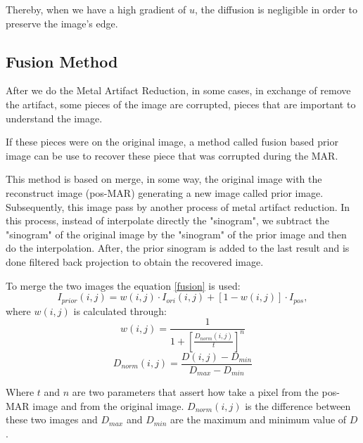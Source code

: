 Thereby, when we have a high gradient of $u$, the diffusion is negligible in order to preserve the image's edge.

\subsection{Fusion Method}

After we do the Metal Artifact Reduction, in some cases, in exchange of remove the artifact, some pieces of the image are corrupted, pieces that are important to understand the image.

If these pieces were on the original image, a method called fusion based prior image can be use to recover these piece that was corrupted during the MAR.

This method is based on merge, in some way, the original image with the reconstruct image (pos-MAR) generating a new image called prior image. Subsequently, this image pass by another process of metal artifact reduction. In this process, instead of interpolate directly the "sinogram", we subtract the "sinogram" of the original image by the "sinogram" of the prior image and then do the interpolation. After, the prior sinogram is added to the last result and is done filtered back projection to obtain the recovered image.

To merge the two images the equation \eqref{fusion} is used:
\begin{equation}\label{fusion}
I_{prior}(i,j) = w(i,j)\cdot I_{ori}(i,j) + [1-w(i,j)]\cdot I_{pos},
\end{equation}
where $w(i,j)$ is calculated through:
\[w(i,j) = \frac{1}{1+[\frac{D_{norm}(i,j)}{t}]^n} \]
\[D_{norm}(i,j) = \frac{D(i,j)-D_{min}}{D_{max}-D_{min}}\]

Where $t$ and $n$ are two parameters that assert how take a pixel from the pos-MAR image and from the original image. $D_{norm}(i,j)$ is the difference between these two images and $D_{max}$ and $D_{min}$ are the maximum and minimum value of $D$.
